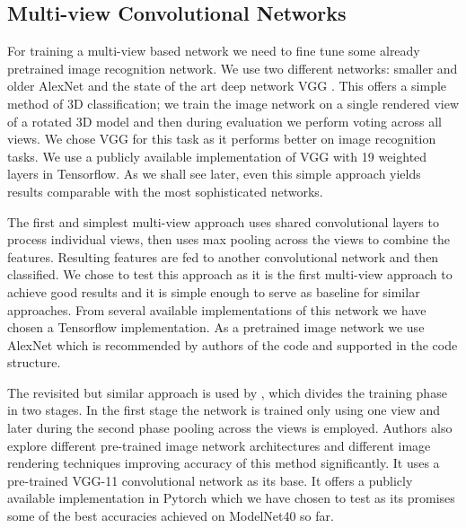 \subsection{Multi-view Convolutional Networks}
For training a multi-view based network we need to fine tune some already pretrained image recognition network. We use two different networks: smaller and older AlexNet \cite{krizhevsky_imagenet_2012} and the state of the art deep network VGG \cite{simonyan_very_2014}. This offers a simple method of 3D classification; we train the image network on a single rendered view of a rotated 3D model and then during evaluation we perform voting across all views. We chose VGG for this task as it performs better on image recognition tasks. We use a publicly available implementation of VGG \cite{machrisaa_tensorflow-vgg_nodate} with 19 weighted layers in Tensorflow. As we shall see later, even this simple approach yields results comparable with the most sophisticated networks.
\par
The first and simplest multi-view approach \cite{su_multi-view_2015} uses shared convolutional layers to process individual views, then uses max pooling across the views to combine the features. Resulting features are fed to another convolutional network and then classified. We chose to test this approach as it is the first multi-view approach to achieve good results and it is simple enough to serve as baseline for similar approaches. From several available implementations of this network we have chosen a Tensorflow implementation. As a pretrained image network we use AlexNet which is recommended by authors of the code and supported in the code structure. 
\par
The revisited but similar approach is used by \cite{su_deeper_2018}, which divides the training phase in two stages. In the first stage the network is trained only using one view and later during the second phase pooling across the views is employed. Authors also explore different pre-trained image network architectures and different image rendering techniques improving accuracy of this method significantly. It uses a pre-trained VGG-11 convolutional network as its base. It offers a publicly available implementation in Pytorch which we have chosen to test as its promises some of the best accuracies achieved on ModelNet40 so far.

